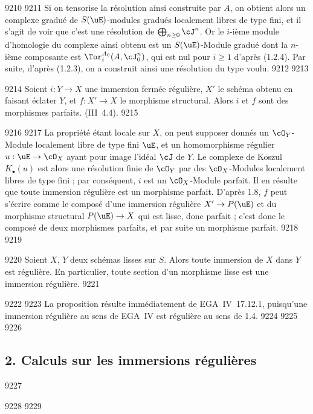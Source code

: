   9210	
  9211	Si on tensorise la r\'esolution ainsi construite par $A$, on obtient alors un complexe gradu\'e de $S(\uE)$-modules gradu\'es localement libres de type fini, et il s'agit de voir que c'est une r\'esolution de $\bigoplus_{n \geq 0} \cJ^n$. Or le $i$-i\`eme module d'homologie du complexe ainsi obtenu est un $S(\uE)$-Module gradu\'e dont la $n$-i\`eme composante est $\Tor_i^{A_0}(A, \cJ_0^n)$, qui est nul pour $i \geq 1$ d'apr\`es (1.2.4). Par suite, d'apr\`es (1.2.3), on a construit ainsi une r\'esolution du type voulu.
  9212	
  9213	\begin{proposition}[1.9]
  9214	Soient $i: Y \to X$ une immersion ferm\'ee r\'eguli\`ere, $X'$ le sch\'ema obtenu en faisant \'eclater $Y$, et $f: X' \to X$ le morphisme structural. Alors $i$ et $f$ sont des morphismes parfaits. \textup{(}III~4.4\textup{)}.
  9215	\end{proposition}
  9216	
  9217	La propri\'et\'e \'etant locale sur $X$, on peut supposer donn\'es un $\cO_Y$-Module localement libre de type fini $\uE$, et un homomorphisme r\'egulier $u: \uE \to \cO_X$ ayant pour image l'id\'eal $\cJ$ de $Y$. Le complexe de Koszul $K_{\bullet}(u)$ est alors une r\'esolution finie de $\cO_Y$ par des $\cO_X$-Modules localement libres de type fini ; par cons\'equent, $i$ est un $\cO_X$-Module parfait. Il en r\'esulte que toute immersion r\'eguli\`ere est un morphisme parfait. D'apr\`es 1.8, $f$ peut s'\'ecrire comme le compos\'e d'une immersion r\'eguli\`ere $X' \to P(\uE)$ et du morphisme structural $P(\uE) \to X$ qui est lisse, donc parfait ; c'est donc le compos\'e de deux morphismes parfaits, et par suite un morphisme parfait.
  9218	
  9219	\begin{proposition}[1.10]
  9220	Soient $X$, $Y$ deux sch\'emas lisses sur $S$. Alors toute immersion de $X$ dans $Y$ est r\'eguli\`ere. En particulier, toute section d'un morphisme lisse est une immersion r\'eguli\`ere.
  9221	\end{proposition}
  9222	
  9223	La proposition r\'esulte imm\'ediatement de EGA~IV~17.12.1, puisqu'une immersion r\'eguli\`ere au sens de EGA~IV est r\'eguli\`ere au sens de 1.4.
  9224	
  9225	%
  9226	\subsection*{2. Calculs sur les immersions r\'eguli\`eres}
  9227	
  9228	
  9229	\setcounter{section}{2}
